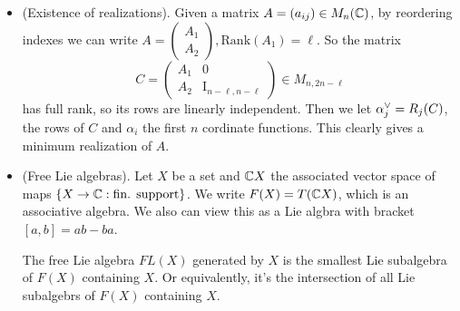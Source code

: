 \begin{itemize}
    assume that $A = (\begin{smallmatrix}A_1\\A_2\end{smallmatrix}), B = (\begin{smallmatrix}B_1\\B_2 \end{smallmatrix})$, where 
    $A_1\in M_{\ell,n}, B_2\in M_{n-\ell,m}$ and $A_1$ has full rank. Then we have
    \begin{equation}
        M = \begin{pmatrix}
            A_1 & B_1 \\
            A_2 & B_2
        \end{pmatrix},\; \text{Rank}(M) = n. 
    \end{equation}
    Therefore $\text{Rank}(B_2) = n - \ell\Rightarrow m\geq n-\ell$. This proves that $\dim(\fr{h})\geq 2n - \ell$. In general 
    we will assume that a realization is minimum in the sense that $\dim(\fr{h}) = 2n - \ell$.
    \item(Existence of realizations). Given a matrix $A=(a_{ij}) \in M_n(\mathbb{C})$, by reordering indexes we can write 
    $A = (\begin{smallmatrix} A_1\\ A_2\end{smallmatrix}), \text{Rank}(A_1) = \ell$. So the matrix 
    \begin{equation}
        C = \begin{pmatrix}
            A_1 & 0 \\
            A_2 & \text{I}_{n-\ell, n - \ell}
        \end{pmatrix}\in M_{n, 2n - \ell}
    \end{equation}
    has full rank, so its rows are linearly independent. 
    Then we let $\alpha^{\vee}_j = R_j(C)$, the rows of $C$ and $\alpha_i$ the first $n$ cordinate functions. This clearly 
    gives a minimum realization of $A$.
    \item(Free Lie algebras). Let $X$ be a set and $\mathbb{C} X$ the associated vector space of maps 
    $\{X\to \mathbb{C} : \text{fin. support}\}$. 
    We write $F(X) = T(\mathbb{C} X)$, which is an associative algebra. We also can view this as a Lie algbra with bracket 
    $[a,b] = ab - ba$. 
    \begin{dang}
        \begin{definition}
            The free Lie algebra $FL(X)$ generated by $X$ is the smallest Lie subalgebra of $F(X)$ containing $X$. Or equivalently, it's 
            the intersection of all Lie subalgebrs of $F(X)$ containing $X$. 

\end{definition}
\end{dang}
\end{itemize}
